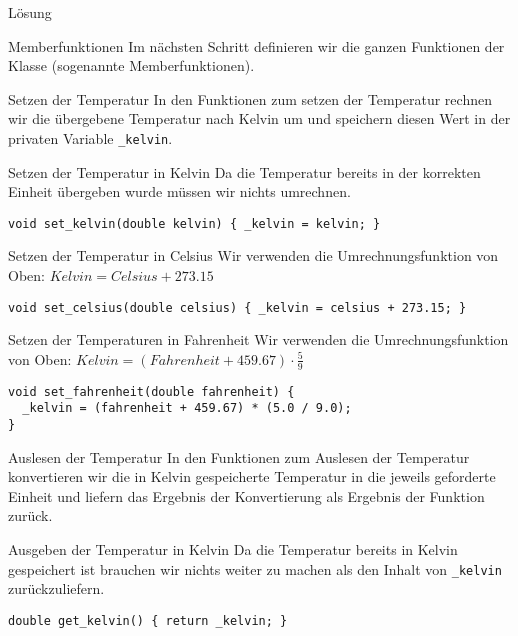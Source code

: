 \documentclass[presentation]{beamer}
\begin{document}
\begin{frame}[label={sec:org40f99e4},fragile]{Lösung}
\begin{block}{Memberfunktionen}
Im nächsten Schritt definieren wir die ganzen Funktionen der Klasse
(sogenannte Memberfunktionen).

\begin{block}{Setzen der Temperatur}
In den Funktionen zum setzen der Temperatur rechnen wir die übergebene
Temperatur nach Kelvin um und speichern diesen Wert in der privaten
Variable {\color{solarizedYellow}\verb!_kelvin!}.
\begin{block}{Setzen der Temperatur in Kelvin}
Da die Temperatur bereits in der korrekten Einheit übergeben wurde
müssen wir nichts umrechnen.
\begin{verbatim}
void set_kelvin(double kelvin) { _kelvin = kelvin; }
\end{verbatim}
\end{block}
\begin{block}{Setzen der Temperatur in Celsius}
Wir verwenden die Umrechnungsfunktion von Oben: \(Kelvin = Celsius + 273.15\)
\begin{verbatim}
void set_celsius(double celsius) { _kelvin = celsius + 273.15; }
\end{verbatim}
\end{block}
\begin{block}{Setzen der Temperaturen in Fahrenheit}
Wir verwenden die Umrechnungsfunktion von Oben: \(Kelvin = (Fahrenheit + 459.67)\cdot\frac{5}{9}\)
\begin{verbatim}
void set_fahrenheit(double fahrenheit) {
  _kelvin = (fahrenheit + 459.67) * (5.0 / 9.0);
}
\end{verbatim}
\end{block}
\end{block}
\begin{block}{Auslesen der Temperatur}
In den Funktionen zum Auslesen der Temperatur konvertieren wir die in
Kelvin gespeicherte Temperatur in die jeweils geforderte Einheit und
liefern das Ergebnis der Konvertierung als Ergebnis der Funktion
zurück.
\begin{block}{Ausgeben der Temperatur in Kelvin}
Da die Temperatur bereits in Kelvin gespeichert ist brauchen wir
nichts weiter zu machen als den Inhalt von {\color{solarizedYellow}\verb!_kelvin!} zurückzuliefern.
\begin{verbatim}
double get_kelvin() { return _kelvin; }

\end{verbatim}
\end{block}
\end{block}
\end{block}
\end{frame}
\end{document}
